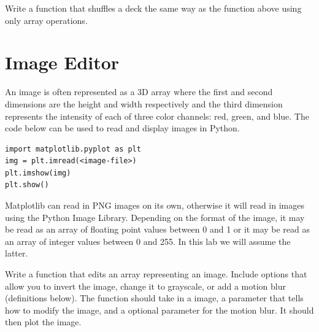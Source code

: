 \begin{problem}
Write a function that shuffles a deck the same way as the function above using only array operations.
\end{problem}

\section*{Image Editor}
An image is often represented as a 3D array where the first and second dimensions are the height and width respectively and the third dimension represents the intensity of each of three color channels: red, green, and blue.
The code below can be used to read and display images in Python.
\begin{lstlisting}
import matplotlib.pyplot as plt
img = plt.imread(<image-file>)
plt.imshow(img)
plt.show()
\end{lstlisting}

Matplotlib can read in PNG images on its own, otherwise it will read in images using the Python Image Library.
Depending on the format of the image, it may be read as an array of floating point values between 0 and 1 or it may be read as an array of integer values between 0 and 255.
In this lab we will assume the latter.

\begin{problem}
Write a function that edits an array representing an image.
Include options that allow you to  invert the image, change it to grayscale, or add a motion blur (definitions below). 
The function should take in a image, a parameter that tells how to modify the image, and a optional parameter for the motion blur.
It should then plot the image. 
\end{problem}

